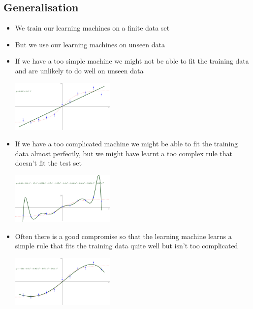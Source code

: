 \documentclass[11pt]{article}
\begin{document}
\subsection{Generalisation}
\label{sec:orgc29fde8}
\begin{itemize}
\item We train our learning machines on a finite data set
\item But we use our learning machines on unseen data
\item If we have a too simple machine we might not be able to fit the
training data and are unlikely to do well on unseen data
\begin{center}
\includegraphics[width=0.4\textwidth]{figures/curveFitting-1.pdf}
\end{center}
\item If we have a too complicated machine we might be able to fit the
training data almost perfectly, but we might have learnt a too
complex rule that doesn't fit the test set
\begin{center}
\includegraphics[width=0.4\textwidth]{figures/curveFitting-3.pdf}
\end{center}
\item Often there is a good compromise so that the learning machine
learns a simple rule that fits the training data quite well but
isn't too complicated
\begin{center}
\includegraphics[width=0.4\textwidth]{figures/curveFitting-2.pdf}
\end{center}
\end{itemize}
\end{document}
